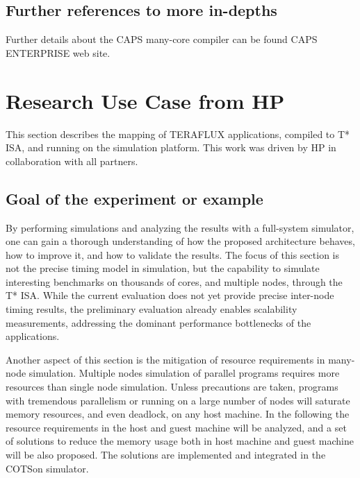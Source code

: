 \documentclass[a4paper]{article}
\begin{document}
\subsection[Further references to more in{}-depths]{Further references
to more in-depths}
{
Further details about the CAPS many-core compiler can be found CAPS
ENTERPRISE web site.}


\bigskip

\section[Research Use Case from HP]{Research Use Case from HP}
{
This section describes the mapping of TERAFLUX applications, compiled to
T* ISA, and running on the simulation platform. This work was driven by
HP in collaboration with all partners.}

\subsection[Goal of the experiment or example]{Goal of the experiment or
example}
{
By performing simulations and analyzing the results with a full-system
simulator, one can gain a thorough understanding of how the proposed
architecture behaves, how to improve it, and how to validate the
results. The focus of this section is not the precise timing model in
simulation, but the capability to simulate interesting benchmarks on
thousands of cores, and multiple nodes, through the T* ISA. While the
current evaluation does not yet provide precise inter-node timing
results, the preliminary evaluation already enables scalability
measurements, addressing the dominant performance bottlenecks of the
applications.}

{
Another aspect of this section is the mitigation of resource
requirements in many-node simulation. Multiple nodes simulation of
parallel programs requires more resources than single node simulation.
Unless precautions are taken, programs with tremendous parallelism or
running on a large number of nodes will saturate memory resources, and
even deadlock, on any host machine. In the following the resource
requirements in the host and guest machine will be analyzed, and a set
of solutions to reduce the memory usage both in host machine and guest
machine will be also proposed. The solutions are implemented and
integrated in the COTSon simulator.}
\end{document}
